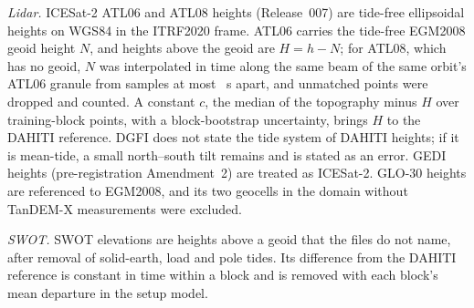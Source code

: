 \emph{Lidar.} ICESat-2 ATL06 and ATL08 heights (Release~007) are tide-free ellipsoidal heights on WGS84 in the ITRF2020 frame\citep{atl06_v7,atl08_v7,is2_compguide_r007}. ATL06 carries the tide-free EGM2008 geoid height $N$, and heights above the geoid are $H = h - N$; for ATL08, which has no geoid, $N$ was interpolated in time along the same beam of the same orbit's ATL06 granule from samples at most ~s apart, and unmatched points were dropped and counted. A constant $c$, the median of the topography minus $H$ over training-block points, with a block-bootstrap uncertainty, brings $H$ to the DAHITI reference. DGFI does not state the tide system of DAHITI heights; if it is mean-tide, a small north--south tilt remains and is stated as an error. GEDI heights (pre-registration Amendment~2) are treated as ICESat-2. GLO-30 heights are referenced to EGM2008\citep{copdem_handbook_i5}, and its two geocells in the domain without TanDEM-X measurements were excluded.

\emph{SWOT.} SWOT elevations are heights above a geoid that the files do not name, after removal of solid-earth, load and pole tides. Its difference from the DAHITI reference is constant in time within a block and is removed with each block's mean departure in the setup model.
